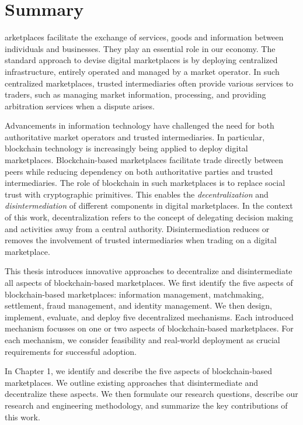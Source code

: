 \chapter*{Summary}

arketplaces facilitate the exchange of services, goods and information between individuals and businesses.
They play an essential role in our economy.
The standard approach to devise digital marketplaces is by deploying centralized infrastructure, entirely operated and managed by a market operator.
In such centralized marketplaces, trusted intermediaries often provide various services to traders, such as managing market information, processing, and providing arbitration services when a dispute arises.

Advancements in information technology have challenged the need for both authoritative market operators and trusted intermediaries.
In particular, blockchain technology is increasingly being applied to deploy digital marketplaces.
Blockchain-based marketplaces facilitate trade directly between peers while reducing dependency on both authoritative parties and trusted intermediaries.
The role of blockchain in such marketplaces is to replace social trust with cryptographic primitives.
This enables the \emph{decentralization} and \emph{disintermediation} of different components in digital marketplaces.
In the context of this work, decentralization refers to the concept of delegating decision making and activities away from a central authority.
Disintermediation reduces or removes the involvement of trusted intermediaries when trading on a digital marketplace.

This thesis introduces innovative approaches to decentralize and disintermediate all aspects of blockchain-based marketplaces.
We first identify the five aspects of blockchain-based marketplaces: information management, matchmaking, settlement, fraud management, and identity management.
We then design, implement, evaluate, and deploy five decentralized mechanisms.
Each introduced mechanism focusses on one or two aspects of blockchain-based marketplaces.
For each mechanism, we consider feasibility and real-world deployment as crucial requirements for successful adoption.

In Chapter 1, we identify and describe the five aspects of blockchain-based marketplaces.
We outline existing approaches that disintermediate and decentralize these aspects.
We then formulate our research questions, describe our research and engineering methodology, and summarize the key contributions of this work.

